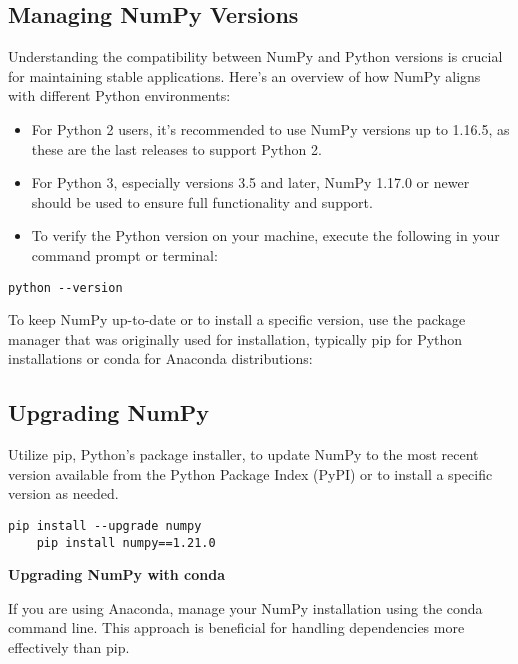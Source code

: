 \subsection{Managing NumPy Versions}
Understanding the compatibility between NumPy and Python versions is crucial for maintaining stable applications. Here's an overview of how NumPy aligns with different Python environments:

\begin{itemize}
	\item For Python 2 users, it's recommended to use NumPy versions up to 1.16.5, as these are the last releases to support Python 2.
	\item For Python 3, especially versions 3.5 and later, NumPy 1.17.0 or newer should be used to ensure full functionality and support.
	\item To verify the Python version on your machine, execute the following in your command prompt or terminal:
\end{itemize}

\begin{lstlisting}[caption={Command to check the installed Python version}, label={code:python-version}, style=pythonstyle]
	python --version
\end{lstlisting}


To keep NumPy up-to-date or to install a specific version, use the package manager that was originally used for installation, typically pip for Python installations or conda for Anaconda distributions:

\subsection{Upgrading NumPy}

Utilize pip, Python's package installer, to update NumPy to the most recent version available from the Python Package Index (PyPI) or to install a specific version as needed.

\begin{lstlisting}[caption={Commands to upgrade or install a specific version of NumPy using pip}, label={code:pip-install-numpy}, style=pythonstyle]
	pip install --upgrade numpy
	pip install numpy==1.21.0
\end{lstlisting}

\textbf{Upgrading NumPy with conda}

If you are using Anaconda, manage your NumPy installation using the conda command line. This approach is beneficial for handling dependencies more effectively than pip.

